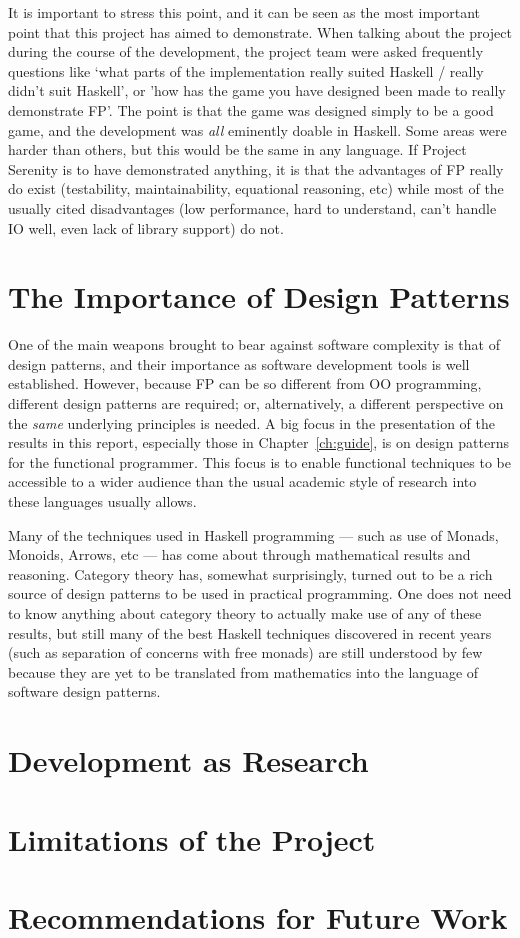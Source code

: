 It is important to stress this point, and it can be seen as the most important point that this project has aimed to demonstrate. When talking about the project during the course of the development, the project team were asked frequently questions like `what parts of the implementation really suited Haskell / really didn't suit Haskell', or 'how has the game you have designed been made to really demonstrate FP'. The point is that the game was designed simply to be a good game, and the development was \emph{all} eminently doable in Haskell. Some areas were harder than others, but this would be the same in any language. If Project Serenity is to have demonstrated anything, it is that the advantages of FP really do exist (testability, maintainability, equational reasoning, etc) while most of the usually cited disadvantages (low performance, hard to understand, can't handle IO well, even lack of library support) do not.

\section{The Importance of Design Patterns}

One of the main weapons brought to bear against software complexity is that of design patterns, and their importance as software development tools is well established. However, because FP can be so different from OO programming, different design patterns are required; or, alternatively, a different perspective on the \emph{same} underlying principles is needed. A big focus in the presentation of the results in this report, especially those in Chapter~\ref{ch:guide}, is on design patterns for the functional programmer. This focus is to enable functional techniques to be accessible to a wider audience than the usual academic style of research into these languages usually allows.

Many of the techniques used in Haskell programming --- such as use of Monads, Monoids, Arrows, etc --- has come about through mathematical results and reasoning. Category theory has, somewhat surprisingly, turned out to be a rich source of design patterns to be used in practical programming. One does not need to know anything about category theory to actually make use of any of these results, but still many of the best Haskell techniques discovered in recent years (such as separation of concerns with free monads) are still understood by few because they are yet to be translated from mathematics into the language of software design patterns.

\section{Development as Research}

\section{Limitations of the Project}

\section{Recommendations for Future Work}

